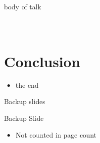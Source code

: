 \begin{frame}{body of talk}


\begin{columns}
\column{2in}
\centering
\begin{figure}
\end{figure}

\begin{figure}
\end{figure}


\column{2in}
\centering
\begin{figure}
\end{figure}

\begin{figure}
\end{figure}

\end{columns}


\end{frame}



\section{Conclusion}

\begin{frame}{\secname}
\begin{itemize}
	\item
	the end

\end{itemize}
\end{frame}

\appendix
\backupbegin

\begin{frame}
\begin{center}
\Huge Backup slides
\end{center}
\end{frame}

\begin{frame}{Backup Slide}
\begin{itemize}
	\item
	Not counted in page count

\end{itemize}
\end{frame}

\backupend


